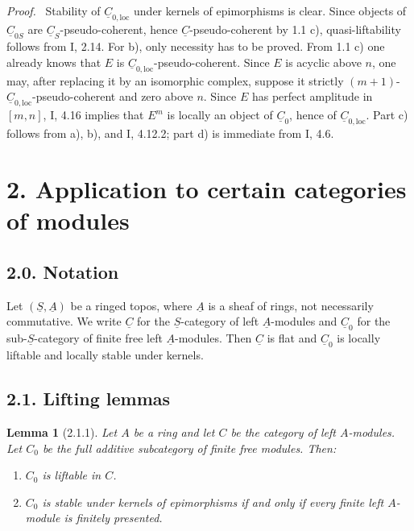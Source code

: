\documentclass[11pt]{article}
\theoremstyle{plain}
\newtheorem*{lemma*}{Lemma}
\theoremstyle{definition}
\theoremstyle{remark}
\newenvironment{prooftext}{\par\noindent\textit{Proof.}\ }{\par\medskip}
\newcommand{\uA}{\underline{A}}\newcommand{\uH}{\underline{H}}\newcommand{\uExt}{\underline{\operatorname{Ext}}}\newcommand{\uL}{\underline{L}}\newcommand{\uM}{\underline{M}}\newcommand{\uZ}{\underline{Z}}\newcommand{\uB}{\underline{B}}\newcommand{\uC}{\underline{C}}\newcommand{\uD}{\underline{D}}\newcommand{\uE}{\underline{E}}\newcommand{\uG}{\underline{G}}\newcommand{\uP}{\underline{P}}\newcommand{\uQ}{\underline{Q}}
\providecommand{\uS}{\underline{S}}
\begin{document}
\begin{prooftext}
Stability of $\uC_{0,\mathrm{loc}}$ under kernels of epimorphisms is clear. Since objects of $\uC_{0S}$ are $\uC_S$-pseudo-coherent, hence $\uC$-pseudo-coherent by 1.1 c), quasi-liftability follows from I, 2.14. For b), only necessity has to be proved. From 1.1 c) one already knows that $E$ is $\uC_{0,\mathrm{loc}}$-pseudo-coherent. Since $E$ is acyclic above $n$, one may, after replacing it by an isomorphic complex, suppose it strictly $(m+1)$-$\uC_{0,\mathrm{loc}}$-pseudo-coherent and zero above $n$. Since $E$ has perfect amplitude in $[m,n]$, I, 4.16 implies that $E^m$ is locally an object of $\uC_0$, hence of $\uC_{0,\mathrm{loc}}$. Part c) follows from a), b), and I, 4.12.2; part d) is immediate from I, 4.6.
\end{prooftext}

\section*{2. Application to certain categories of modules}

\subsection*{2.0. Notation}
Let $(\uS,\uA)$ be a ringed topos, where $\uA$ is a sheaf of rings, not necessarily commutative. We write $\uC$ for the $\uS$-category of left $\uA$-modules and $\uC_0$ for the sub-$\uS$-category of finite free left $\uA$-modules. Then $\uC$ is flat and $\uC_0$ is locally liftable and locally stable under kernels.

\subsection*{2.1. Lifting lemmas}
\begin{lemma*}[2.1.1]
Let $A$ be a ring and let $C$ be the category of left $A$-modules. Let $C_0$ be the full additive subcategory of finite free modules. Then:
\begin{enumerate}[label=\alph*)]
\item $C_0$ is liftable in $C$.
\item $C_0$ is stable under kernels of epimorphisms if and only if every finite left $A$-module is finitely presented.
\end{enumerate}
\end{lemma*}
\end{document}
